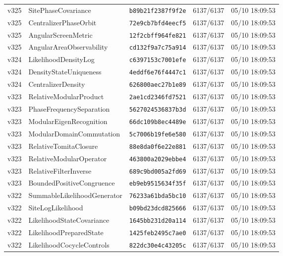 \documentclass[11pt]{article}
\theoremstyle{definition}\newtheorem{deriv}{Derivação}
\begin{document}
{\begin{longtable}{@{}lllll@{}}
v325 & SitePhaseCovariance & \texttt{b89b21f2387f9f2e} & 6137/6137 & 05/10 18:09:53 \\
v325 & CentralizerPhaseOrbit & \texttt{72e9cb7bfd4eecf5} & 6137/6137 & 05/10 18:09:53 \\
v325 & AngularScreenMetric & \texttt{12f2cbff964fe821} & 6137/6137 & 05/10 18:09:53 \\
v325 & AngularAreaObservability & \texttt{cd132f9a7c75a914} & 6137/6137 & 05/10 18:09:53 \\
v324 & LikelihoodDensityLog & \texttt{c6397153c7001efe} & 6137/6137 & 05/10 18:09:53 \\
v324 & DensityStateUniqueness & \texttt{4eddf6e76f4447c1} & 6137/6137 & 05/10 18:09:53 \\
v324 & CentralizerDensity & \texttt{626800aec27b1e89} & 6137/6137 & 05/10 18:09:53 \\
v323 & RelativeModularProduct & \texttt{2ae1cd2346fd7521} & 6137/6137 & 05/10 18:09:53 \\
v323 & PhaseFrequencySeparation & \texttt{5627024536837b3d} & 6137/6137 & 05/10 18:09:53 \\
v323 & ModularEigenRecognition & \texttt{66dc109b8ec4489e} & 6137/6137 & 05/10 18:09:53 \\
v323 & ModularDomainCommutation & \texttt{5c7006b19fe6e580} & 6137/6137 & 05/10 18:09:53 \\
v323 & RelativeTomitaClosure & \texttt{88e8da0f6e22e881} & 6137/6137 & 05/10 18:09:53 \\
v323 & RelativeModularOperator & \texttt{463800a2029ebbe4} & 6137/6137 & 05/10 18:09:53 \\
v323 & RelativeFilterInverse & \texttt{689c9bd005a2fd69} & 6137/6137 & 05/10 18:09:53 \\
v323 & BoundedPositiveCongruence & \texttt{eb9eb9515634f35f} & 6137/6137 & 05/10 18:09:53 \\
v322 & SummableLikelihoodGenerator & \texttt{76233a61bda5bc10} & 6137/6137 & 05/10 18:09:53 \\
v322 & SiteLogLikelihood & \texttt{b09bd23dcd825666} & 6137/6137 & 05/10 18:09:53 \\
v322 & LikelihoodStateCovariance & \texttt{1645bb231d20a114} & 6137/6137 & 05/10 18:09:53 \\
v322 & LikelihoodPreparedState & \texttt{1425feb2495c7ae0} & 6137/6137 & 05/10 18:09:53 \\
v322 & LikelihoodCocycleControls & \texttt{822dc30e4c43205c} & 6137/6137 & 05/10 18:09:53 \\

\end{longtable}}
\end{document}
